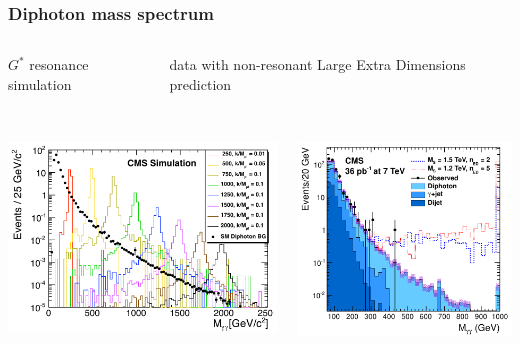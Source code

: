 \documentclass[compress]{beamer}
\begin{document}
\begin{frame}
\frametitle{Diphoton mass spectrum}

\begin{columns}
\centering $G^*$ resonance simulation \\ \mbox{ }

\centering data with non-resonant Large Extra Dimensions prediction
\end{columns}

\begin{columns}
\includegraphics[width=\linewidth]{plots/diphoton_resonant_simulation.png}

\includegraphics[width=\linewidth]{plots/diphoton_nonresonant_led.png}
\end{columns}


\end{frame}
\end{document}
